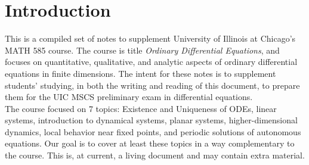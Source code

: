 \section{Introduction}

This is a compiled set of notes to supplement University of Illinois at Chicago's MATH 585 course. The course is title \textit{Ordinary Differential Equations}, and focuses on quantitative, qualitative, and analytic aspects of ordinary differential equations in finite dimensions. The intent for these notes is to supplement students' studying, in both the writing and reading of this document, to prepare them for the UIC MSCS preliminary exam in differential equations. \\
\indent The course focused on 7 topics: Existence and Uniqueness of ODEs, linear systems, introduction to dynamical systems, planar systems, higher-dimensional dynamics, local behavior near fixed points, and periodic solutions of autonomous equations. Our goal is to cover at least these topics in a way complementary to the course. This is, at current, a living document and may contain extra material.
